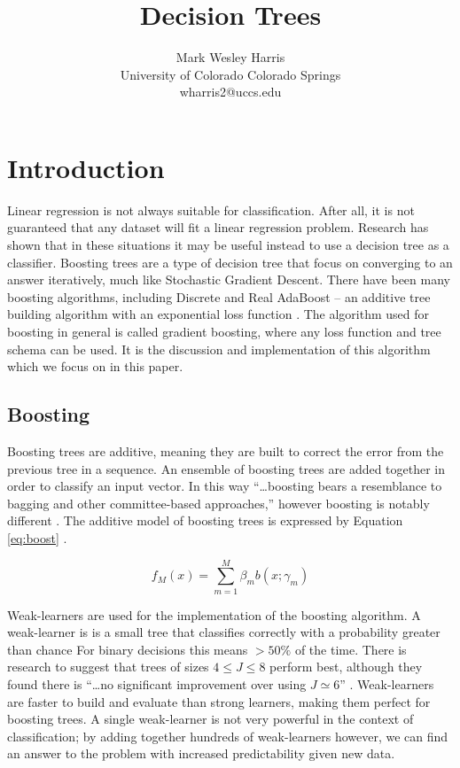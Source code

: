 \documentclass[letterpaper]{article} %
\title{Decision Trees}
\author{Mark Wesley Harris\\ %
University of Colorado Colorado Springs\\
wharris2@uccs.edu %
}
\begin{document}
\maketitle

\section{Introduction}
Linear regression is not always suitable for classification.
After all, it is not guaranteed that any dataset will fit a linear regression problem.
Research has shown that in these situations it may be useful instead to use a decision tree as a classifier.
Boosting trees are a type of decision tree that focus on converging to an answer iteratively,
much like Stochastic Gradient Descent.
There have been many boosting algorithms, including Discrete and Real AdaBoost --
an additive tree building algorithm with an exponential loss function \cite{additive}.
The algorithm used for boosting in general is called gradient boosting,
where any loss function and tree schema can be used.
It is the discussion and implementation of this
algorithm which we focus on in this paper.

\subsection{Boosting}
Boosting trees are additive, meaning they are built to correct the error from
the previous tree in a sequence.
An ensemble of boosting trees are added together in order to classify an input vector.
In this way
``\dots boosting bears a resemblance to bagging and other
committee-based approaches,'' however boosting is notably different
\cite{elements}.
The additive model of boosting trees is expressed by Equation
\ref{eq:boost} \cite{elements}.

\begin{equation}
\label{eq:boost}
f_M(x) = \sum_{m = 1}^{M}\beta_mb(x;\gamma_m)
\end{equation}

Weak-learners are used for the implementation of the boosting algorithm.
A weak-learner is is a small tree that classifies
correctly with a probability greater than chance
For binary decisions this means $>50\%$ of the time.
There is research to suggest that trees of sizes $4 \leq J \leq 8$ perform best,
although they found there is
``\dots no significant improvement over using $J \simeq 6$'' \cite{elements}.
Weak-learners are faster to build and evaluate than strong learners,
making them perfect for boosting trees.
A single weak-learner is not very powerful in the context of classification;
by adding together hundreds of weak-learners however, we can find an answer
to the problem with increased predictability given new data.
\end{document}
